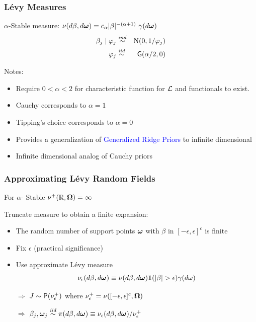 \documentclass[dvips]{beamer}
\newcommand{\bs}[2]{\begin{frame} \frametitle{#1} 
{#2}
\end{frame} }
\newcommand{\blue}{\textcolor{Blue}}
\begin{document}
\bs{L\'evy Measures} {


$\alpha$-Stable measure: $\nu(d\beta, d\bm \omega) =  c_\alpha |\beta|^{-(\alpha
    +1)}\ \gamma(d\bm \omega)$
  \begin{eqnarray*}
    \beta_j   \mid  \varphi_j & \mathrel{\mathop{\sim}\limits^{\mathit{ind}}} &\mbox{\rm N}(0, 1/\varphi_j) \\       
      \varphi_j & \mathrel{\mathop{\sim}\limits^{\mathit{iid}}} & \mbox{\sf G}(\alpha/2, 0)
  \end{eqnarray*}

Notes:
  \begin{itemize}
\item Require $0 < \alpha < 2$ for characteristic function for ${\cal L}$ and
  functionals to exist.  
\item  Cauchy corresponds to $\alpha = 1$
\item  Tipping's choice corresponds to $\alpha = 0$
\item Provides a generalization of \blue{Generalized Ridge Priors}
      to infinite dimensional 
\item Infinite dimensional analog of Cauchy priors
 \end{itemize}
}

\bs{Approximating L\'evy Random Fields} {
For $\alpha$- Stable $\nu^+(\mathbb{R}, \bm \Omega) = \infty$

\vspace{.25in}
Truncate measure to obtain a finite expansion:
\begin{itemize}
 \item The random number of support points $\bm \omega$ with $\beta$ in $[-\epsilon, \epsilon]^c$ is finite
\item Fix $\epsilon$  (practical significance) 
\item Use approximate L\'evy  measure 
$$\nu_{\epsilon}(d\beta, d\bm \omega) \equiv \nu(d\beta,
d\bm \omega){\bm 1}(|\beta| > \epsilon) \gamma(d\omega)$$
\item[$\Rightarrow$] $J \sim \mbox{\sf P}(\nu_{\epsilon}^+)$ where
  $\nu^+_{\epsilon} = \nu([-\epsilon, \epsilon]^c, \bm \Omega)$
\item[$\Rightarrow$]  $\beta_j, \bm \omega_j \mathrel{\mathop{\sim}\limits^{\mathit{iid}}} \pi(d\beta, d\bm \omega) \equiv
  \nu_\epsilon(d\beta , d \bm \omega)/\nu^+_{\epsilon}$

\end{itemize}
}
\end{document}
